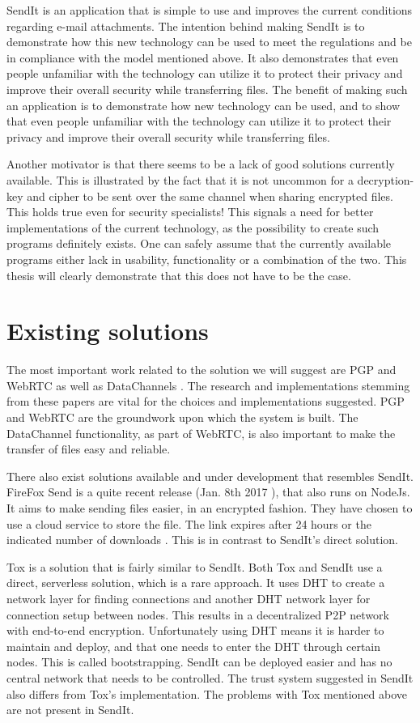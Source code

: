 SendIt is an application that is simple to use and improves the current conditions regarding e-mail attachments. The intention behind making SendIt is to demonstrate how this new technology can be used to meet the regulations and be in compliance with the model mentioned above. It also demonstrates that even people unfamiliar with the technology can utilize it to protect their privacy and improve their overall security while transferring files. The benefit of making such an application is to demonstrate how new technology can be used, and to show that even people unfamiliar with the technology can utilize it to protect their privacy and improve their overall security while transferring files.

Another motivator is that there seems to be a lack of good solutions currently available. This is illustrated by the fact that it is not uncommon for a decryption-key and cipher to be sent over the same channel when sharing encrypted files. This holds true even for security specialists! This signals a need for better implementations of the current technology, as the possibility to create such programs definitely exists. One can safely assume that the currently available programs either lack in usability, functionality or a combination of the two. This thesis will clearly demonstrate that this does not have to be the case.
%
\section{Existing solutions}
\label{sec:related}
%
The most important work related to the solution we will suggest are PGP \cite{ar_pgp} and WebRTC \cite{ar_webrtc} as well as DataChannels \cite{ar_webrtc_dc,url_webrtc_data}.
The research and implementations stemming from these papers are vital for the choices and implementations suggested. PGP and WebRTC are the groundwork upon which the system is built. The DataChannel functionality, as part of WebRTC, is also important to make the transfer of files easy and reliable.

There also exist solutions available and under development that resembles SendIt. FireFox Send is a quite recent release (Jan. 8th 2017 ), that also runs on NodeJs. It aims to make sending files easier, in an encrypted fashion. They have chosen to use a cloud service to store the file. The link expires after 24 hours or the indicated number of downloads \cite{url_firesend}. This is in contrast to SendIt's direct solution.

Tox is a solution that is fairly similar to SendIt. Both Tox and SendIt use a direct, serverless solution, which is a rare approach. It uses DHT to create a network layer for finding connections and another DHT network layer for connection setup between nodes. This results in a decentralized P2P network with end-to-end encryption. Unfortunately using DHT means it is harder to maintain and deploy, and that one needs to enter the DHT through certain nodes. This is called bootstrapping. SendIt can be deployed easier and has no central network that needs to be controlled. The trust system suggested in SendIt also differs from Tox's implementation. The problems with Tox mentioned above are not present in SendIt\cite{url_tox,url_toxdoc}.

